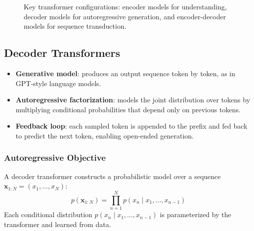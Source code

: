 \documentclass[11pt,a4paper]{article}
\theoremstyle{definition}
\theoremstyle{plain}
\theoremstyle{remark}
\begin{document}
\begin{figure}[h!]
\begin{minipage}{0.3\textwidth}
\end{minipage}
\caption{Key transformer configurations: encoder models for understanding, decoder models for autoregressive generation, and encoder-decoder models for sequence transduction.}
\label{fig:transformer-architectures}
\end{figure}

\subsection{Decoder Transformers}

\begin{tcolorbox}[colback=blue!5!white,colframe=blue!75!black,title=\textbf{Decoder Transformer: Key Idea}]
\begin{itemize}
    \item \textbf{Generative model}: produces an output sequence token by token, as in GPT-style language models.
    \item \textbf{Autoregressive factorization}: models the joint distribution over tokens by multiplying conditional probabilities that depend only on previous tokens.
    \item \textbf{Feedback loop}: each sampled token is appended to the prefix and fed back to predict the next token, enabling open-ended generation.
\end{itemize}
\end{tcolorbox}

\subsubsection{Autoregressive Objective}

A decoder transformer constructs a probabilistic model over a sequence $\mathbf{x}_{1:N} = (x_1, \ldots, x_N)$:
\[
p(\mathbf{x}_{1:N}) = \prod_{n=1}^{N} p\left(x_n \mid x_1, \ldots, x_{n-1}\right)
\]
Each conditional distribution $p\left(x_n \mid x_1, \ldots, x_{n-1}\right)$ is parameterized by the transformer and learned from data.
\end{document}
